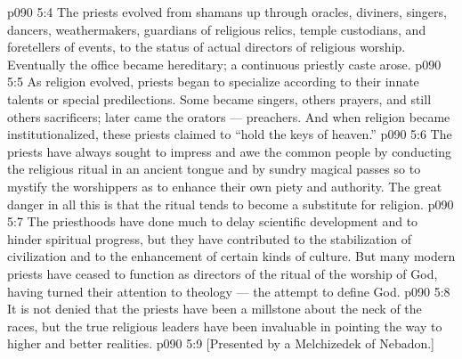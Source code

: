 \vs p090 5:4 \pc The priests evolved from shamans up through oracles, diviners, singers, dancers, weathermakers, guardians of religious relics, temple custodians, and foretellers of events, to the status of actual directors of religious worship. Eventually the office became hereditary; a continuous priestly caste arose.
\vs p090 5:5 As religion evolved, priests began to specialize according to their innate talents or special predilections. Some became singers, others prayers, and still others sacrificers; later came the orators --- preachers. And when religion became institutionalized, these priests claimed to “hold the keys of heaven.”
\vs p090 5:6 The priests have always sought to impress and awe the common people by conducting the religious ritual in an ancient tongue and by sundry magical passes so to mystify the worshippers as to enhance their own piety and authority. The great danger in all this is that the ritual tends to become a substitute for religion.
\vs p090 5:7 The priesthoods have done much to delay scientific development and to hinder spiritual progress, but they have contributed to the stabilization of civilization and to the enhancement of certain kinds of culture. But many modern priests have ceased to function as directors of the ritual of the worship of God, having turned their attention to theology --- the attempt to define God.
\vs p090 5:8 It is not denied that the priests have been a millstone about the neck of the races, but the true religious leaders have been invaluable in pointing the way to higher and better realities.
\vsetoff
\vs p090 5:9 [Presented by a Melchizedek of Nebadon.]
\quizlink
